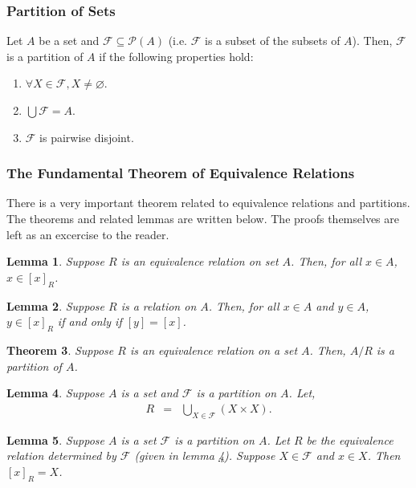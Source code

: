 \documentclass{article}
\newtheorem{theorem}{Theorem}[section]
\newtheorem{lemma}[theorem]{Lemma}
\begin{document}
\subsubsection{Partition of Sets}
Let $A$ be a set and $\mathcal{F} \subseteq \mathcal{P}(A)$ (i.e. $\mathcal{F}$ is a subset of the subsets of $A$). Then, $\mathcal{F}$ is a
partition of $A$ if the following properties hold:
\begin{enumerate}
    \item $\forall X \in \mathcal{F}, X \neq \varnothing$.
    \item $\bigcup \mathcal{F} = A$.
    \item $\mathcal{F}$ is pairwise disjoint.
\end{enumerate}

\subsubsection{The Fundamental Theorem of Equivalence Relations}
There is a very important theorem related to equivalence relations and partitions. The theorems and related lemmas are written below. The
proofs themselves are left as an excercise to the reader. \\

\begin{lemma} \label{eq_relate_lemma_A}
    Suppose $R$ is an equivalence relation on set $A$. Then, for all $x \in A$, $x \in [x]_R$.
\end{lemma}

\begin{lemma} \label{eq_relate_lemma_B}
    Suppose $R$ is a relation on $A$. Then, for all $x \in A$ and $y \in A$, $y \in [x]_R$ if and only if $[y] =[x]$.
\end{lemma}

\begin{theorem} \label{eq_relate_theorem_1}
    Suppose $R$ is an equivalence relation on a set $A$. Then, $A / R$ is a partition of $A$. 
\end{theorem}

\begin{lemma} \label{eq_relate_lemma_1}
    Suppose $A$ is a set and $\mathcal{F}$ is a partition on $A$. Let,
    \begin{eqnarray*}
        R &=& \bigcup_{X \in \mathcal{F}} (X \times X).
    \end{eqnarray*}
\end{lemma}

\begin{lemma} \label{eq_relate_lemma_2}
    Suppose $A$ is a set $\mathcal{F}$ is a partition on $A$. Let $R$ be the equivalence relation determined by $\mathcal{F}$ (given in lemma 
    \ref{eq_relate_lemma_1}). Suppose $X \in \mathcal{F}$ and $x \in X$. Then $[x]_R = X$.
\end{lemma}
\end{document}
